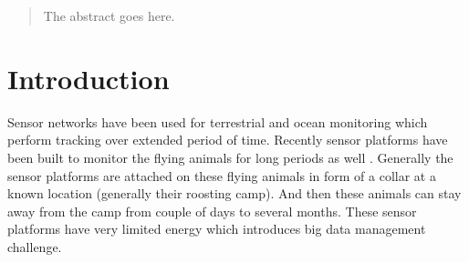 \documentclass[conference]{IEEEtran}
\begin{document}




\maketitle


\begin{abstract}
The abstract goes here.
\end{abstract}





%
\IEEEpeerreviewmaketitle
\section{Introduction}\label{sec:intro}

Sensor networks have been used for terrestrial \cite{robo-mote} and ocean 
monitoring \cite{Vasilescu05krill:an} which perform tracking over extended period of time. 
Recently sensor platforms have been built to monitor the flying animals for long periods as well 
\cite{Anthony:2012:STC:2185677.2185747} \cite{raja-ipsn}. Generally the sensor platforms are 
attached on these flying animals in form of a collar at a known location (generally their roosting 
camp). And then these animals can stay away from the camp from couple of days to several months. 
These sensor platforms have very limited energy which introduces big data management challenge. 

\end{document}
